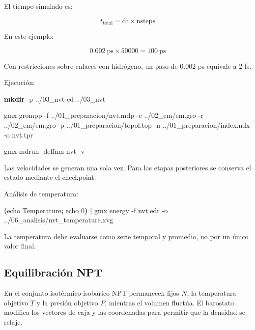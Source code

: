 \documentclass[
  spanish,
  11pt,
  a4paper]{article}
\newenvironment{Shaded}{\begin{snugshade}}{\end{snugshade}}
\newcommand{\AttributeTok}[1]{\textcolor[rgb]{0.13,0.29,0.53}{#1}}
\newcommand{\BuiltInTok}[1]{#1}
\newcommand{\ExtensionTok}[1]{#1}
\newcommand{\FunctionTok}[1]{\textcolor[rgb]{0.13,0.29,0.53}{\textbf{#1}}}
\newcommand{\KeywordTok}[1]{\textcolor[rgb]{0.13,0.29,0.53}{\textbf{#1}}}
\newcommand{\NormalTok}[1]{#1}
\begin{document}
El tiempo simulado es:

\[
t_{\mathrm{total}}=\mathrm{dt}\times\mathrm{nsteps}
\]

En este ejemplo:

\[
0.002\ \mathrm{ps}\times 50000=100\ \mathrm{ps}
\]

Con restricciones sobre enlaces con hidrógeno, un paso de 0.002 ps
equivale a 2 fs.

Ejecución:

\begin{Shaded}
\begin{Highlighting}[]
\FunctionTok{mkdir} \AttributeTok{{-}p}\NormalTok{ ../03\_nvt}
\BuiltInTok{cd}\NormalTok{ ../03\_nvt}

\ExtensionTok{gmx}\NormalTok{ grompp     }\AttributeTok{{-}f}\NormalTok{ ../01\_preparacion/nvt.mdp     }\AttributeTok{{-}c}\NormalTok{ ../02\_em/em.gro     }\AttributeTok{{-}r}\NormalTok{ ../02\_em/em.gro     }\AttributeTok{{-}p}\NormalTok{ ../01\_preparacion/topol.top     }\AttributeTok{{-}n}\NormalTok{ ../01\_preparacion/index.ndx     }\AttributeTok{{-}o}\NormalTok{ nvt.tpr}

\ExtensionTok{gmx}\NormalTok{ mdrun }\AttributeTok{{-}deffnm}\NormalTok{ nvt }\AttributeTok{{-}v}
\end{Highlighting}
\end{Shaded}

Las velocidades se generan una sola vez. Para las etapas posteriores se
conserva el estado mediante el checkpoint.

Análisis de temperatura:

\begin{Shaded}
\begin{Highlighting}[]
\KeywordTok{(}\BuiltInTok{echo}\NormalTok{ Temperature}\KeywordTok{;} \BuiltInTok{echo}\NormalTok{ 0}\KeywordTok{)} \KeywordTok{|}
\ExtensionTok{gmx}\NormalTok{ energy }\AttributeTok{{-}f}\NormalTok{ nvt.edr }\AttributeTok{{-}o}\NormalTok{ ../06\_analisis/nvt\_temperature.xvg}
\end{Highlighting}
\end{Shaded}

La temperatura debe evaluarse como serie temporal y promedio, no por un
único valor final.

\subsection{Equilibración NPT}\label{equilibraciuxf3n-npt}

En el conjunto isotérmico-isobárico NPT permanecen fijos \(N\), la
temperatura objetivo \(T\) y la presión objetivo \(P\), mientras el
volumen fluctúa. El barostato modifica los vectores de caja y las
coordenadas para permitir que la densidad se relaje.
\end{document}
